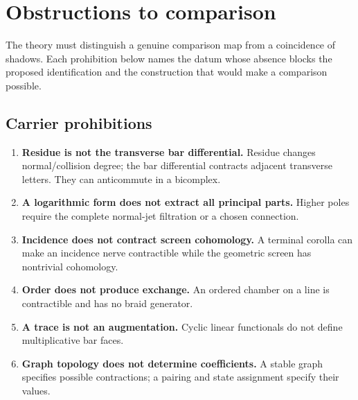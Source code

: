 \chapter{Obstructions to comparison}\label{chap:nogo}

The theory must distinguish a genuine comparison map from a coincidence of
shadows.  Each prohibition below names the datum whose absence blocks the
proposed identification and the construction that would make a comparison
possible.

\section{Carrier prohibitions}
\begin{enumerate}[series=nogo,label=\textbf{N\arabic*.},ref=N\arabic*]
\item \textbf{Residue is not the transverse bar differential.}  Residue changes normal/collision degree; the bar differential contracts adjacent transverse letters.  They can anticommute in a bicomplex.
\item \textbf{A logarithmic form does not extract all principal parts.}  Higher poles require the complete normal-jet filtration or a chosen connection.
\item \textbf{Incidence does not contract screen cohomology.}  A terminal corolla can make an incidence nerve contractible while the geometric screen has nontrivial cohomology.
\item \textbf{Order does not produce exchange.}  An ordered chamber on a line is contractible and has no braid generator.
\item \textbf{A trace is not an augmentation.}  Cyclic linear functionals do not define multiplicative bar faces.
\item \textbf{Graph topology does not determine coefficients.}  A stable graph specifies possible contractions; a pairing and state assignment specify their values.
\end{enumerate}

